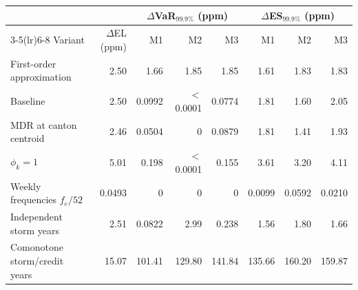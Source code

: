 \begin{tabular}{lrrrrrrr}
\toprule
 & & \multicolumn{3}{c}{$\Delta$VaR$_{99.9\%}$ (ppm)} & \multicolumn{3}{c}{$\Delta$ES$_{99.9\%}$ (ppm)} \\
\cmidrule(lr){3-5}\cmidrule(lr){6-8}
Variant & $\Delta$EL (ppm) & M1 & M2 & M3 & M1 & M2 & M3 \\
\midrule
First-order approximation & 2.50 & 1.66 & 1.85 & 1.85 & 1.61 & 1.83 & 1.83 \\
\midrule
Baseline & 2.50 & 0.0992 & $<$0.0001 & 0.0774 & 1.81 & 1.60 & 2.05 \\
MDR at canton centroid & 2.46 & 0.0504 & 0 & 0.0879 & 1.81 & 1.41 & 1.93 \\
$\phi_k=1$ & 5.01 & 0.198 & $<$0.0001 & 0.155 & 3.61 & 3.20 & 4.11 \\
Weekly frequencies $f_e/52$ & 0.0493 & 0 & 0 & 0 & 0.0099 & 0.0592 & 0.0210 \\
Independent storm years & 2.51 & 0.0822 & 2.99 & 0.238 & 1.56 & 1.80 & 1.66 \\
Comonotone storm/credit years & 15.07 & 101.41 & 129.80 & 141.84 & 135.66 & 160.20 & 159.87 \\
\bottomrule
\end{tabular}
